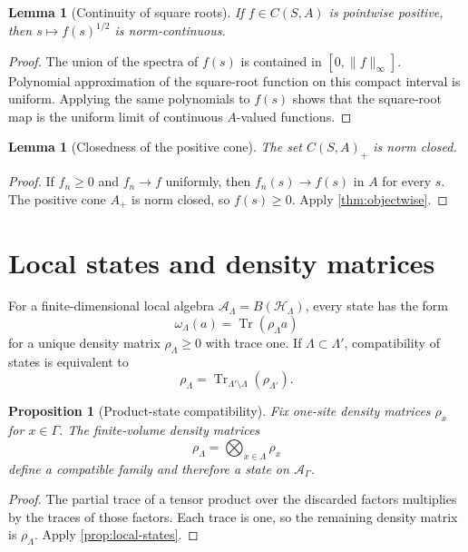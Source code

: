 \documentclass[12pt]{article}
\newtheorem{proposition}[theorem]{Proposition}
\newtheorem{lemma}[theorem]{Lemma}
\theoremstyle{definition}
\theoremstyle{remark}
\newcommand{\A}{\mathcal A}
\begin{document}
\begin{lemma}[Continuity of square roots]
If $f\in C(S,A)$ is pointwise positive, then $s\mapsto f(s)^{1/2}$ is norm-continuous.
\end{lemma}

\begin{proof}
The union of the spectra of $f(s)$ is contained in
$[0,\|f\|_\infty]$.  Polynomial approximation of the square-root function on this
compact interval is uniform.  Applying the same polynomials to $f(s)$ shows that the
square-root map is the uniform limit of continuous $A$-valued functions.
\end{proof}

\begin{lemma}[Closedness of the positive cone]
The set $C(S,A)_+$ is norm closed.
\end{lemma}

\begin{proof}
If $f_n\geq0$ and $f_n\to f$ uniformly, then $f_n(s)\to f(s)$ in $A$ for every $s$.
The positive cone $A_+$ is norm closed, so $f(s)\geq0$.  Apply
\cref{thm:objectwise}.
\end{proof}

\section{Local states and density matrices}

For a finite-dimensional local algebra $\A_\Lambda=B(\mathcal H_\Lambda)$, every
state has the form
\[
\omega_\Lambda(a)=\operatorname{Tr}(\rho_\Lambda a)
\]
for a unique density matrix $\rho_\Lambda\geq0$ with trace one.  If
$\Lambda\subset\Lambda'$, compatibility of states is equivalent to
\[
\rho_\Lambda
=
\operatorname{Tr}_{\Lambda'\setminus\Lambda}(\rho_{\Lambda'}).
\]

\begin{proposition}[Product-state compatibility]
Fix one-site density matrices $\rho_x$ for $x\in\Gamma$.  The finite-volume density
matrices
\[
\rho_\Lambda=\bigotimes_{x\in\Lambda}\rho_x
\]
define a compatible family and therefore a state on $\A_\Gamma$.
\end{proposition}

\begin{proof}
The partial trace of a tensor product over the discarded factors multiplies by the
traces of those factors.  Each trace is one, so the remaining density matrix is
$\rho_\Lambda$.  Apply \cref{prop:local-states}.
\end{proof}
\end{document}
